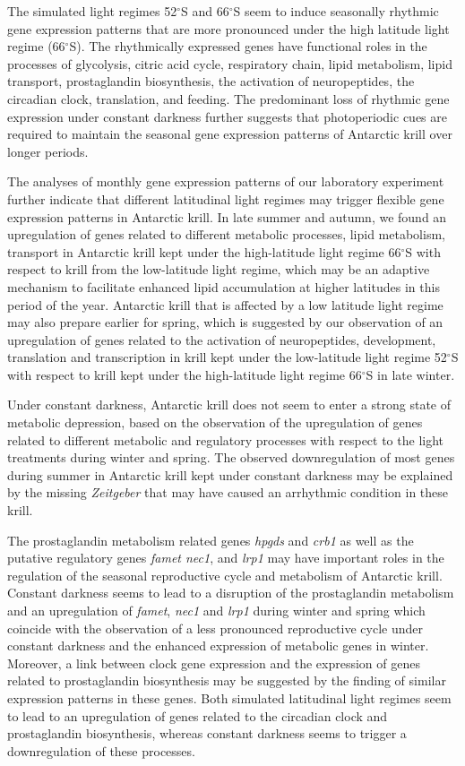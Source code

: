 The simulated light regimes 52$^{\circ}$S and 66$^{\circ}$S seem to induce
seasonally rhythmic gene expression patterns that are more pronounced under the
high latitude light regime (66$^{\circ}$S). The rhythmically expressed genes
have functional roles in the processes of glycolysis, citric acid cycle,
respiratory chain, lipid metabolism, lipid transport, prostaglandin
biosynthesis, the activation of neuropeptides, the circadian clock,
translation, and feeding. The predominant loss of rhythmic gene expression
under constant darkness further suggests that photoperiodic cues are required
to maintain the seasonal gene expression patterns of Antarctic krill over
longer periods.

The analyses of monthly gene expression patterns of our laboratory experiment
further indicate that different latitudinal light regimes may trigger flexible
gene expression patterns in Antarctic krill. In late summer and autumn, we
found an upregulation of genes related to different metabolic processes, lipid
metabolism, transport in Antarctic krill kept under the high-latitude light
regime 66$^{\circ}$S with respect to krill from the low-latitude light regime,
which may be an adaptive mechanism to facilitate enhanced lipid accumulation at
higher latitudes in this period of the year. Antarctic krill that is affected
by a low latitude light regime may also prepare earlier for spring, which is
suggested by our observation of an upregulation of genes related to the
activation of neuropeptides, development, translation and transcription in
krill kept under the low-latitude light regime 52$^{\circ}$S with respect to
krill kept under the high-latitude light regime 66$^{\circ}$S in late winter.

Under constant darkness, Antarctic krill does not seem to enter a strong state
of metabolic depression, based on the observation of the upregulation of genes
related to different metabolic and regulatory processes with respect to the
light treatments during winter and spring. The observed downregulation of most
genes during summer in Antarctic krill kept under constant darkness may be
explained by the missing \textit{Zeitgeber} that may have caused an arrhythmic
condition in these krill.

The prostaglandin metabolism related genes \textit{hpgds} and \textit{crb1} as
well as the putative regulatory genes \textit{famet nec1}, and \textit{lrp1}
may have important roles in the regulation of the seasonal reproductive cycle
and metabolism of Antarctic krill. Constant darkness seems to lead to a
disruption of the prostaglandin metabolism and an upregulation of
\textit{famet}, \textit{nec1} and \textit{lrp1} during winter and spring which
coincide with the observation of a less pronounced reproductive cycle under
constant darkness \citep{horing_light_2018} and the enhanced expression of
metabolic genes in winter. Moreover, a link between clock gene expression and
the expression of genes related to prostaglandin biosynthesis may be suggested
by the finding of similar expression patterns in these genes. Both simulated
latitudinal light regimes seem to lead to an upregulation of genes related to
the circadian clock and prostaglandin biosynthesis, whereas constant darkness
seems to trigger a downregulation of these processes. 

